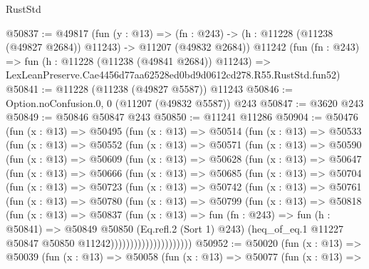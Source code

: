 \begin{lexlean}{RustStd}
\begin{coremodule}
@50837 := @49817
    (fun (y : @13) =>
    (fn : @243) -> (h : @11228 (@11238 (@49827 @2684)) @11243) -> @11207 (@49832 @2684))
    @11242
    (fun (fn : @243) =>
    fun (h : @11228 (@11238 (@49841 @2684)) @11243) =>
    LexLeanPreserve.Cae4456d77aa62528ed0bd9d0612cd278.R55.RustStd.fun52)
@50841 := @11228 (@11238 (@49827 @5587)) @11243
@50846 := Option.noConfusion.{0, 0} (@11207 (@49832 @5587)) @243
@50847 := @3620 @243
@50849 := @50846 @50847 @243
@50850 := @11241 @11286
@50904 := @50476
    (fun (x : @13) =>
    @50495
      (fun (x : @13) =>
      @50514
        (fun (x : @13) =>
        @50533
          (fun (x : @13) =>
          @50552
            (fun (x : @13) =>
            @50571
              (fun (x : @13) =>
              @50590
                (fun (x : @13) =>
                @50609
                  (fun (x : @13) =>
                  @50628
                    (fun (x : @13) =>
                    @50647
                      (fun (x : @13) =>
                      @50666
                        (fun (x : @13) =>
                        @50685
                          (fun (x : @13) =>
                          @50704
                            (fun (x : @13) =>
                            @50723
                              (fun (x : @13) =>
                              @50742
                                (fun (x : @13) =>
                                @50761
                                  (fun (x : @13) =>
                                  @50780
                                    (fun (x : @13) =>
                                    @50799
                                      (fun (x : @13) =>
                                      @50818
                                        (fun (x : @13) =>
                                        @50837
                                          (fun (x : @13) =>
                                          fun (fn : @243) =>
                                          fun (h : @50841) =>
                                          @50849
                                            @50850
                                            (Eq.refl.{2} (Sort 1) @243)
                                            (heq_of_eq.{1}
                                              @11227
                                              @50847
                                              @50850
                                              @11242)))))))))))))))))))))
@50952 := @50020
    (fun (x : @13) =>
    @50039
      (fun (x : @13) =>
      @50058
        (fun (x : @13) =>
        @50077
          (fun (x : @13) =>

\end{coremodule}
\end{lexlean}
